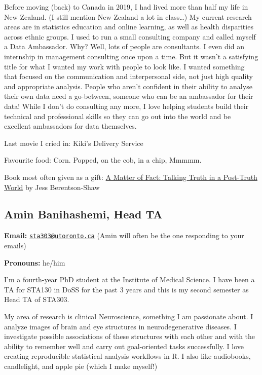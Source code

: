\documentclass[
]{book}
\begin{document}
Before moving (back) to Canada in 2019, I had lived more than half my life in New Zealand. (I still mention New Zealand a lot in class\ldots) My current research areas are in statistics education and online learning, as well as health disparities across ethnic groups. I used to run a small consulting company and called myself a Data Ambassador. Why? Well, lots of people are consultants. I even did an internship in management consulting once upon a time. But it wasn't a satisfying title for what I wanted my work with people to look like. I wanted something that focused on the communication and interpersonal side, not just high quality and appropriate analysis. People who aren't confident in their ability to analyse their own data need a go-between, someone who can be an ambassador for their data! While I don't do consulting any more, I love helping students build their technical and professional skills so they can go out into the world and be excellent ambassadors for data themselves.

Last movie I cried in: Kiki's Delivery Service

Favourite food: Corn. Popped, on the cob, in a chip, Mmmmm.

Book most often given as a gift: \href{https://www.goodreads.com/book/show/41123067-a-matter-of-fact}{A Matter of Fact: Talking Truth in a Post-Truth World} by Jess Berentson-Shaw

\hypertarget{amin-banihashemi-head-ta}{%
\subsection{Amin Banihashemi, Head TA}\label{amin-banihashemi-head-ta}}

\textbf{Email:} \href{mailto:sta303@utoronto.ca}{\nolinkurl{sta303@utoronto.ca}} (Amin will often be the one responding to your emails)

\textbf{Pronouns:} he/him

I'm a fourth-year PhD student at the Institute of Medical Science. I have been a TA for STA130 in DoSS for the past 3 years and this is my second semester as Head TA of STA303.

My area of research is clinical Neuroscience, something I am passionate about. I analyze images of brain and eye structures in neurodegenerative diseases. I investigate possible associations of these structures with each other and with the ability to remember well and carry out goal-oriented tasks successfully. I love creating reproducible statistical analysis workflows in R. I also like audiobooks, candlelight, and apple pie (which I make myself!)
\end{document}
